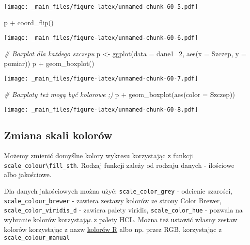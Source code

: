 \documentclass[
]{book}
\newenvironment{Shaded}{\begin{snugshade}}{\end{snugshade}}
\newcommand{\AttributeTok}[1]{\textcolor[rgb]{0.77,0.63,0.00}{#1}}
\newcommand{\CommentTok}[1]{\textcolor[rgb]{0.56,0.35,0.01}{\textit{#1}}}
\newcommand{\FunctionTok}[1]{\textcolor[rgb]{0.00,0.00,0.00}{#1}}
\newcommand{\NormalTok}[1]{#1}
\newcommand{\OtherTok}[1]{\textcolor[rgb]{0.56,0.35,0.01}{#1}}
\newcommand{\SpecialCharTok}[1]{\textcolor[rgb]{0.00,0.00,0.00}{#1}}
\begin{document}
\texttt{[image: \_main\_files/figure-latex/unnamed-chunk-60-5.pdf]}

\begin{Shaded}
\begin{Highlighting}[]
\NormalTok{p }\SpecialCharTok{+} \FunctionTok{coord\_flip}\NormalTok{()}
\end{Highlighting}
\end{Shaded}

\texttt{[image: \_main\_files/figure-latex/unnamed-chunk-60-6.pdf]}

\begin{Shaded}
\begin{Highlighting}[]
\CommentTok{\# Boxplot dla każdego szczepu}
\NormalTok{p }\OtherTok{\textless{}{-}} \FunctionTok{ggplot}\NormalTok{(}\AttributeTok{data =}\NormalTok{ dane1\_2, }\FunctionTok{aes}\NormalTok{(}\AttributeTok{x =}\NormalTok{ Szczep, }\AttributeTok{y =}\NormalTok{ pomiar))}
\NormalTok{p }\SpecialCharTok{+} \FunctionTok{geom\_boxplot}\NormalTok{()}
\end{Highlighting}
\end{Shaded}

\texttt{[image: \_main\_files/figure-latex/unnamed-chunk-60-7.pdf]}

\begin{Shaded}
\begin{Highlighting}[]
\CommentTok{\# Boxploty też mogą być kolorowe ;)}
\NormalTok{p }\SpecialCharTok{+} \FunctionTok{geom\_boxplot}\NormalTok{(}\FunctionTok{aes}\NormalTok{(}\AttributeTok{color =}\NormalTok{ Szczep))}
\end{Highlighting}
\end{Shaded}

\texttt{[image: \_main\_files/figure-latex/unnamed-chunk-60-8.pdf]}

\hypertarget{zmiana-skali-koloruxf3w}{%
\subsection{Zmiana skali kolorów}\label{zmiana-skali-koloruxf3w}}

Możemy zmienić domyślne kolory wykresu korzystając z funkcji \texttt{scale\_colour\textbackslash{}fill\_sth}. Rodzaj funkcji zależy od rodzaju danych - ilościowe albo jakościowe.

Dla danych jakościowych można użyć: \texttt{scale\_color\_grey} - odcienie szarości, \texttt{scale\_colour\_brewer} - zawiera zestawy kolorów ze strony \href{http://colorbrewer2.org/}{Color Brewer}, \texttt{scale\_color\_viridis\_d} - zawiera palety viridis, \texttt{scale\_color\_hue} - pozwala na wybranie kolorów korzystając z palety HCL. Można też ustawić własny zestaw kolorów korzystając z nazw \href{http://www.stat.columbia.edu/~tzheng/files/Rcolor.pdf}{kolorów R} albo np. przez RGB, korzystając z \texttt{scale\_colour\_manual}
\end{document}
